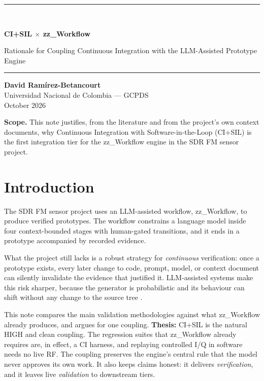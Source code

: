 \documentclass[11pt,a4paper]{article}
\begin{document}
\begin{titlepage}
\thispagestyle{empty}
\vspace*{35mm}
{\color{accent}\rule{\textwidth}{1.2pt}}\\[8mm]
{\Huge\bfseries CI+SIL $\times$ zz\_Workflow\par}
\vspace{6mm}
{\Large\color{muted} Rationale for Coupling Continuous Integration with the LLM-Assisted Prototype Engine\par}
\vspace{8mm}
{\color{accent}\rule{\textwidth}{0.4pt}}
\vspace{20mm}

{\large\bfseries David Ramírez-Betancourt}\\[2mm]
{\large Universidad Nacional de Colombia --- GCPDS}\\[2mm]
{\large October 2026}
\vfill
\begin{notebox}\small
\textbf{Scope.} This note justifies, from the literature and from the project's own
context documents, why Continuous Integration with Software-in-the-Loop (CI+SIL) is the
first integration tier for the zz\_Workflow engine in the SDR FM sensor project.
\end{notebox}
\end{titlepage}

\section{Introduction}

The SDR FM sensor project uses an LLM-assisted workflow, zz\_Workflow, to produce verified
prototypes. The workflow constrains a language model inside four context-bounded stages
with human-gated transitions, and it ends in a prototype accompanied by recorded evidence.

What the project still lacks is a robust strategy for \emph{continuous} verification:
once a prototype exists, every later change to code, prompt, model, or context document
can silently invalidate the evidence that justified it. LLM-assisted systems make this
risk sharper, because the generator is probabilistic and its behaviour can shift without
any change to the source tree \cite{pith2026,mittal2026}.

This note compares the main validation methodologies against what zz\_Workflow already
produces, and argues for one coupling. \textbf{Thesis:} CI+SIL is the natural HIGH and
clean coupling. The regression suites that zz\_Workflow already requires are, in effect,
a CI harness, and replaying controlled I/Q in software needs no live RF. The coupling
preserves the engine's central rule that the model never approves its own work. It also
keeps claims honest: it delivers \emph{verification}, and it leaves live
\emph{validation} to downstream tiers.
\end{document}
